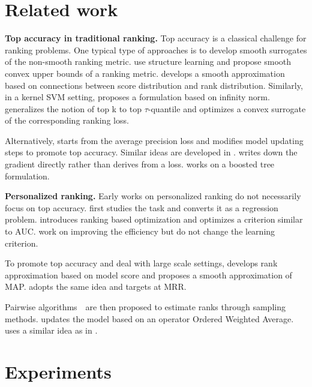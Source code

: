 \documentclass[letterpaper]{article}
\begin{document}
\section{Related work}
\label{sec:related}

\textbf{Top accuracy in traditional ranking.} Top accuracy is a classical challenge for ranking problems. %
One typical type of approaches is to develop smooth surrogates of the non-smooth ranking metric.\cite{weimer2008cofi} use structure learning and propose smooth convex upper bounds of a ranking metric. \cite{taylor2008softrank} develops a smooth approximation based on connections between score distribution and rank distribution. Similarly, in a kernel SVM setting, \cite{agarwal2011infinite} proposes a formulation based on infinity norm. \cite{boyd2012accuracy} generalizes the notion of top k to top $\tau$-quantile and optimizes a convex surrogate of the corresponding ranking loss.

Alternatively, \cite{burges2005learning} starts from the average precision loss and modifies model updating steps to promote top accuracy. Similar ideas are developed in \cite{burges2007learning,wu2010adapting}. \cite{burges2007learning} writes down the gradient directly rather than derives from a loss. \cite{wu2010adapting} works on a boosted tree formulation.

\noindent\textbf{Personalized ranking.} Early works on personalized ranking do not necessarily focus on top accuracy. \cite{hu2008collaborative} first studies the task and converts it as a regression problem. \cite{rendle2009bpr} introduces ranking based optimization and optimizes a criterion similar to AUC. \cite{rendle2014improving} work on improving the efficiency but do not change the learning criterion.

To promote top accuracy and deal with large scale settings, \cite{shi2012tfmap} develops rank approximation based on model score and proposes a smooth approximation of MAP. \cite{shi2012climf} adopts the same idea and targets at MRR.

Pairwise algorithms~\cite{weston2010large,yuan2016lambdafm}~are then proposed to estimate ranks through sampling methods. \cite{weston2010large} updates the model based on an operator Ordered Weighted Average. \cite{yuan2016lambdafm} uses a similar idea as in \cite{burges2005learning}.

\section{Experiments}
\label{sec:exp}
\end{document}
